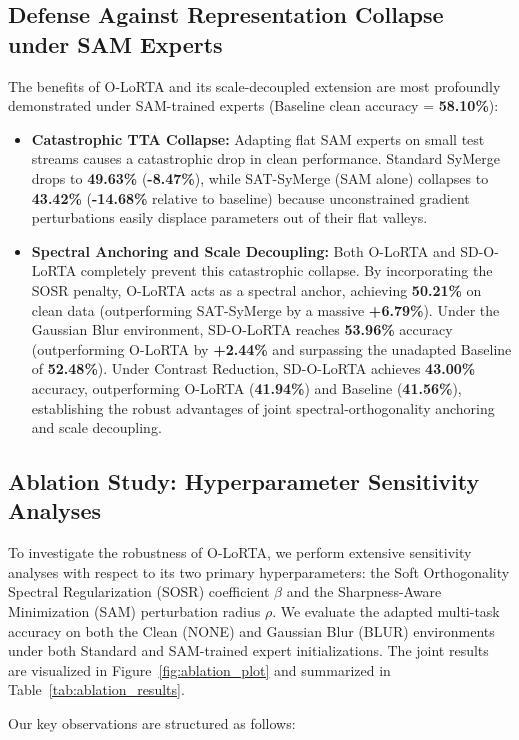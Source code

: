\documentclass{article}
\theoremstyle{plain}
\theoremstyle{definition}
\theoremstyle{remark}
\begin{document}
\subsection{Defense Against Representation Collapse under SAM Experts}
The benefits of O-LoRTA and its scale-decoupled extension are most profoundly demonstrated under SAM-trained experts (Baseline clean accuracy = \textbf{58.10\%}):
\begin{itemize}
    \item \textbf{Catastrophic TTA Collapse:} Adapting flat SAM experts on small test streams causes a catastrophic drop in clean performance. Standard SyMerge drops to \textbf{49.63\%} (\textbf{-8.47\%}), while SAT-SyMerge (SAM alone) collapses to \textbf{43.42\%} (\textbf{-14.68\%} relative to baseline) because unconstrained gradient perturbations easily displace parameters out of their flat valleys.
    \item \textbf{Spectral Anchoring and Scale Decoupling:} Both O-LoRTA and SD-O-LoRTA completely prevent this catastrophic collapse. By incorporating the SOSR penalty, O-LoRTA acts as a spectral anchor, achieving \textbf{50.21\%} on clean data (outperforming SAT-SyMerge by a massive \textbf{+6.79\%}). Under the Gaussian Blur environment, SD-O-LoRTA reaches \textbf{53.96\%} accuracy (outperforming O-LoRTA by \textbf{+2.44\%} and surpassing the unadapted Baseline of \textbf{52.48\%}). Under Contrast Reduction, SD-O-LoRTA achieves \textbf{43.00\%} accuracy, outperforming O-LoRTA (\textbf{41.94\%}) and Baseline (\textbf{41.56\%}), establishing the robust advantages of joint spectral-orthogonality anchoring and scale decoupling.
\end{itemize}

\subsection{Ablation Study: Hyperparameter Sensitivity Analyses}
To investigate the robustness of O-LoRTA, we perform extensive sensitivity analyses with respect to its two primary hyperparameters: the Soft Orthogonality Spectral Regularization (SOSR) coefficient $\beta$ and the Sharpness-Aware Minimization (SAM) perturbation radius $\rho$. We evaluate the adapted multi-task accuracy on both the Clean (NONE) and Gaussian Blur (BLUR) environments under both Standard and SAM-trained expert initializations. The joint results are visualized in Figure~\ref{fig:ablation_plot} and summarized in Table~\ref{tab:ablation_results}.

Our key observations are structured as follows:
\end{document}
